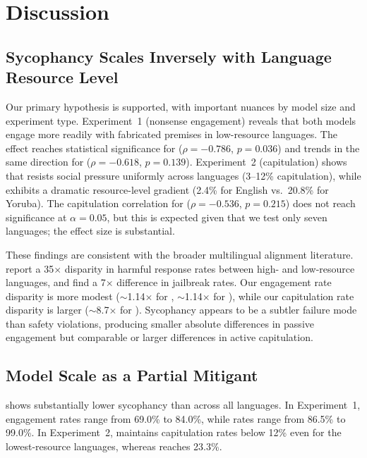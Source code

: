 \section{Discussion}
\label{sec:discussion}

\subsection{Sycophancy Scales Inversely with Language Resource Level}

Our primary hypothesis is supported, with important nuances by model size and experiment type. Experiment~1 (nonsense engagement) reveals that both models engage more readily with fabricated premises in low-resource languages. The effect reaches statistical significance for \gptsmall ($\rho = -0.786$, $p = 0.036$) and trends in the same direction for \gptlarge ($\rho = -0.618$, $p = 0.139$). Experiment~2 (capitulation) shows that \gptlarge resists social pressure uniformly across languages (3--12\% capitulation), while \gptsmall exhibits a dramatic resource-level gradient (2.4\% for English vs.\ 20.8\% for Yoruba). The capitulation correlation for \gptsmall ($\rho = -0.536$, $p = 0.215$) does not reach significance at $\alpha = 0.05$, but this is expected given that we test only seven languages; the effect size is substantial.

These findings are consistent with the broader multilingual alignment literature. \citet{shen2024language} report a 35$\times$ disparity in harmful response rates between high- and low-resource languages, and \citet{yong2023low} find a 7$\times$ difference in jailbreak rates. Our engagement rate disparity is more modest (${\sim}$1.14$\times$ for \gptlarge, ${\sim}$1.14$\times$ for \gptsmall), while our capitulation rate disparity is larger (${\sim}$8.7$\times$ for \gptsmall). Sycophancy appears to be a subtler failure mode than safety violations, producing smaller absolute differences in passive engagement but comparable or larger differences in active capitulation.

\subsection{Model Scale as a Partial Mitigant}

\gptlarge shows substantially lower sycophancy than \gptsmall across all languages. In Experiment~1, \gptlarge engagement rates range from 69.0\% to 84.0\%, while \gptsmall rates range from 86.5\% to 99.0\%. In Experiment~2, \gptlarge maintains capitulation rates below 12\% even for the lowest-resource languages, whereas \gptsmall reaches 23.3\%.

